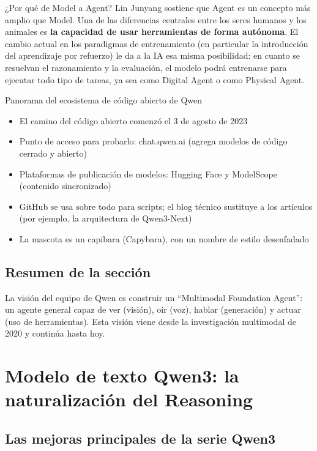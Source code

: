 \documentclass[a4paper]{article}
\begin{document}
\begin{importantbox}{¿Por qué de Model a Agent?}
Lin Junyang sostiene que Agent es un concepto más amplio que Model. Una de las diferencias centrales entre los seres humanos y los animales es \textbf{la capacidad de usar herramientas de forma autónoma}. El cambio actual en los paradigmas de entrenamiento (en particular la introducción del aprendizaje por refuerzo) le da a la IA esa misma posibilidad: en cuanto se resuelvan el razonamiento y la evaluación, el modelo podrá entrenarse para ejecutar todo tipo de tareas, ya sea como Digital Agent o como Physical Agent.
\end{importantbox}

\begin{knowledgebox}{Panorama del ecosistema de código abierto de Qwen}
\begin{itemize}
    \item El camino del código abierto comenzó el 3 de agosto de 2023
    \item Punto de acceso para probarlo: chat.qwen.ai (agrega modelos de código cerrado y abierto)
    \item Plataformas de publicación de modelos: Hugging Face y ModelScope (contenido sincronizado)
    \item GitHub se usa sobre todo para scripts; el blog técnico sustituye a los artículos (por ejemplo, la arquitectura de Qwen3-Next)
    \item La mascota es un capibara (Capybara), con un nombre de estilo desenfadado
\end{itemize}
\end{knowledgebox}

\subsection{Resumen de la sección}

La visión del equipo de Qwen es construir un ``Multimodal Foundation Agent'': un agente general capaz de ver (visión), oír (voz), hablar (generación) y actuar (uso de herramientas). Esta visión viene desde la investigación multimodal de 2020 y continúa hasta hoy.

\section{Modelo de texto Qwen3: la naturalización del Reasoning}

\subsection{Las mejoras principales de la serie Qwen3}
\end{document}

